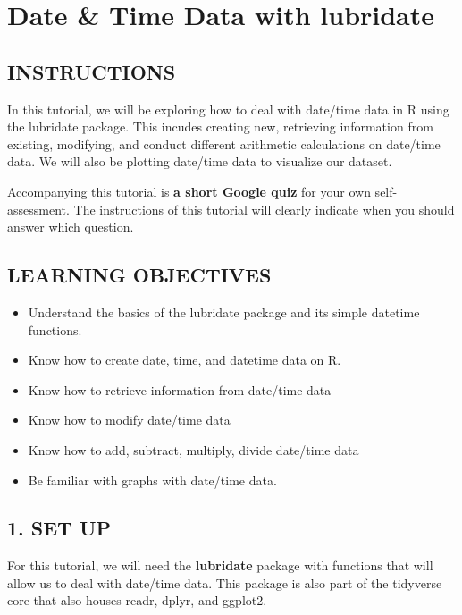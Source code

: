 \documentclass[
]{book}
\providecommand{\tightlist}{%
  \setlength{\itemsep}{0pt}\setlength{\parskip}{0pt}}
\begin{document}
\hypertarget{date-time-data-with-lubridate}{%
\chapter{Date \& Time Data with lubridate}\label{date-time-data-with-lubridate}}

\hypertarget{instructions-6}{%
\section{INSTRUCTIONS}\label{instructions-6}}

In this tutorial, we will be exploring how to deal with date/time data in R using the lubridate package. This incudes creating new, retrieving information from existing, modifying, and conduct different arithmetic calculations on date/time data. We will also be plotting date/time data to visualize our dataset.

Accompanying this tutorial is \textbf{a short \href{https://forms.gle/zt9vGevq3zuqGBTG8}{Google quiz}} for your own self-assessment. The instructions of this tutorial will clearly indicate when you should answer which question.

\hypertarget{learning-objectives-6}{%
\section{LEARNING OBJECTIVES}\label{learning-objectives-6}}

\begin{itemize}
\tightlist
\item
  Understand the basics of the lubridate package and its simple datetime functions.
\item
  Know how to create date, time, and datetime data on R.
\item
  Know how to retrieve information from date/time data
\item
  Know how to modify date/time data
\item
  Know how to add, subtract, multiply, divide date/time data
\item
  Be familiar with graphs with date/time data.
\end{itemize}

\hypertarget{set-up-3}{%
\section{1. SET UP}\label{set-up-3}}

For this tutorial, we will need the \textbf{lubridate} package with functions that will allow us to deal with date/time data. This package is also part of the tidyverse core that also houses readr, dplyr, and ggplot2.
\end{document}
